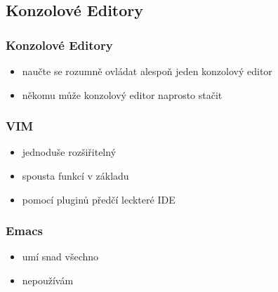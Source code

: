 

\subsection{Konzolové Editory}

\begin{frame}
	\frametitle{Konzolové Editory}
	\begin{itemize}
		\item{naučte se rozumně ovládat alespoň jeden konzolový editor}
		\item{někomu může konzolový editor naprosto stačit}
	\end{itemize}
\end{frame}

\begin{frame}
	\frametitle{VIM}
	\begin{itemize}
		\item{jednoduše rozšiřitelný}
		\item{spousta funkcí v základu}
		\item{pomocí pluginů předčí leckteré IDE}
	\end{itemize}
\end{frame}

\begin{frame}
	\frametitle{Emacs}
	\begin{itemize}
		\item{umí snad všechno}
		\item{nepoužívám}
	\end{itemize}
\end{frame}

